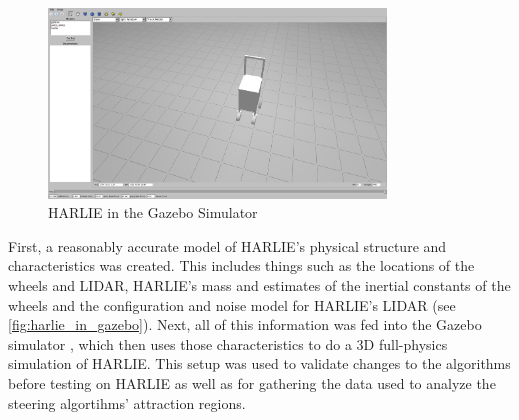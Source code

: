 \begin{figure}
\centering
\includegraphics[width=0.80\textwidth]{images/harlie_in_gazebo}
\caption{HARLIE in the Gazebo Simulator \label{fig:harlie_in_gazebo}}
\end{figure}

First, a reasonably accurate model of HARLIE's physical structure and characteristics was created. This includes things such as the locations of the wheels and LIDAR, HARLIE's mass and estimates of the inertial constants of the wheels and the configuration and noise model for HARLIE's LIDAR (see \autoref{fig:harlie_in_gazebo}). Next, all of this information was fed into the Gazebo simulator \autocite{Koenig04designand}, which then uses those characteristics to do a 3D full-physics simulation of HARLIE. This setup was used to validate changes to the algorithms before testing on HARLIE as well as for gathering the data used to analyze the steering algortihms' attraction regions.

